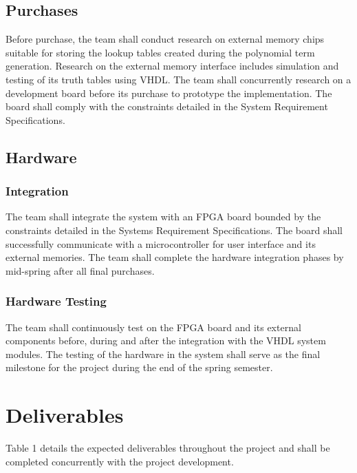 \documentclass[12pt]{extarticle}
\begin{document}
        \subsection{Purchases} Before purchase, the team shall conduct research
        on external memory chips suitable for storing the lookup tables created
        during the polynomial term generation. Research on the external memory
        interface includes simulation and testing of its truth tables using
        VHDL. The team shall concurrently research on a development board
        before its purchase to prototype the implementation. The board shall
        comply with the constraints detailed in the System Requirement
        Specifications.

        \subsection{Hardware}

            \subsubsection{Integration} The team shall integrate the system
            with an FPGA board bounded by the constraints detailed in the
            Systems Requirement Specifications. The board shall successfully
            communicate with a microcontroller for user interface and its
            external memories. The team shall complete the hardware integration
            phases by mid-spring after all final purchases.

            \subsubsection{Hardware Testing} The team shall continuously test
            on the FPGA board and its external components before, during and
            after the integration with the VHDL system modules. The testing of
            the hardware in the system shall serve as the final milestone for
            the project during the end of the spring semester.

    \newpage
    \section{Deliverables} Table 1 details the expected deliverables throughout
    the project and shall be completed concurrently with the project
    development.
\end{document}
